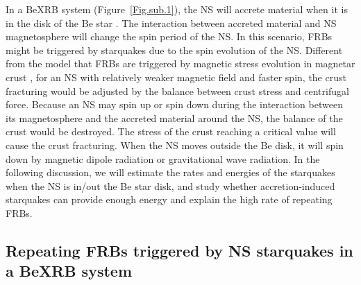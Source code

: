 \documentclass[twocolumn]{aastex62}
\begin{document}
In a BeXRB system (Figure~\ref{Fig.sub.1}), the NS will accrete material when it is in the disk of the Be star \citep[e.g.,][]{oka01, wil18}.
The interaction between accreted material and NS magnetosphere will change the spin period of the NS.
In this scenario, FRBs might be triggered by starquakes due to the spin evolution of the NS. Different from the model that FRBs are triggered by magnetic stress evolution in magnetar crust \citep{yan21}, for an NS with relatively weaker magnetic field and faster spin, the crust fracturing would be adjusted by the balance between crust stress and centrifugal force.
Because an NS may spin up or spin down during the interaction between its magnetosphere and the accreted material around the NS, the balance of the crust would be destroyed.
The stress of the crust reaching a critical value will cause the crust fracturing.
When the NS moves outside the Be disk, it will spin down by magnetic dipole radiation or gravitational wave radiation.
In the following discussion, we will estimate the rates and energies of the starquakes when the NS is in/out the Be star disk, and study whether accretion-induced starquakes can provide enough energy and explain the high rate of repeating FRBs.

\subsection{Repeating FRBs triggered by NS starquakes in a BeXRB system}\label{sec2.1}
\end{document}
